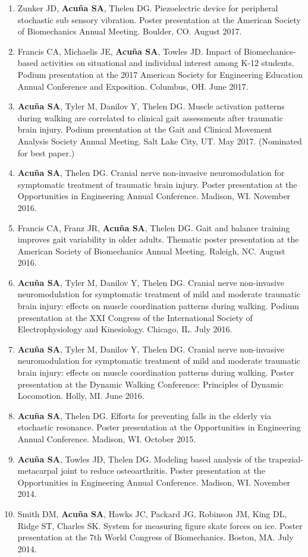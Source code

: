 \documentclass[letterpaper, 10pt]{article}
\begin{document}
\begin{enumerate}
    \item Zunker JD, \textbf{Acuña SA}, Thelen DG. Piezoelectric device for peripheral stochastic sub sensory vibration. Poster presentation at the American Society of Biomechanics Annual Meeting. Boulder, CO. August 2017.
    \item Francis CA, Michaelis JE, \textbf{Acuña SA}, Towles JD. Impact of Biomechanics-based activities on situational and individual interest among K-12 students. Podium presentation at the 2017 American Society for Engineering Education Annual Conference and Exposition. Columbus, OH. June 2017.
    \item \textbf{Acuña SA}, Tyler M, Danilov Y, Thelen DG. Muscle activation patterns during walking are correlated to clinical gait assessments after traumatic brain injury. Podium presentation at the Gait and Clinical Movement Analysis Society Annual Meeting. Salt Lake City, UT. May 2017. (Nominated for best paper.)
    \item \textbf{Acuña SA}, Thelen DG. Cranial nerve non-invasive neuromodulation for symptomatic treatment of traumatic brain injury. Poster presentation at the Opportunities in Engineering Annual Conference. Madison, WI. November 2016.
    \item Francis CA, Franz JR, \textbf{Acuña SA}, Thelen DG. Gait and balance training improves gait variability in older adults. Thematic poster presentation at the American Society of Biomechanics Annual Meeting. Raleigh, NC. August 2016.
    \item \textbf{Acuña SA}, Tyler M, Danilov Y, Thelen DG. Cranial nerve non-invasive neuromodulation for symptomatic treatment of mild and moderate traumatic brain injury: effects on muscle coordination patterns during walking. Podium presentation at the XXI Congress of the International Society of Electrophysiology and Kinesiology. Chicago, IL. July 2016.
    \item \textbf{Acuña SA}, Tyler M, Danilov Y, Thelen DG. Cranial nerve non-invasive neuromodulation for symptomatic treatment of mild and moderate traumatic brain injury: effects on muscle coordination patterns during walking. Poster presentation at the Dynamic Walking Conference: Principles of Dynamic Locomotion. Holly, MI. June 2016.
    \item \textbf{Acuña SA}, Thelen DG. Efforts for preventing falls in the elderly via stochastic resonance. Poster presentation at the Opportunities in Engineering Annual Conference. Madison, WI. October 2015.
    \item \textbf{Acuña SA}, Towles JD, Thelen DG. Modeling based analysis of the trapezial-metacarpal joint to reduce osteoarthritis. Poster presentation at the Opportunities in Engineering Annual Conference. Madison, WI. November 2014.
    \item Smith DM, \textbf{Acuña SA}, Hawks JC, Packard JG, Robinson JM, King DL, Ridge ST, Charles SK. System for measuring ﬁgure skate forces on ice. Poster presentation at the 7th World Congress of Biomechanics. Boston, MA. July 2014.
    
\end{enumerate}
\end{document}
